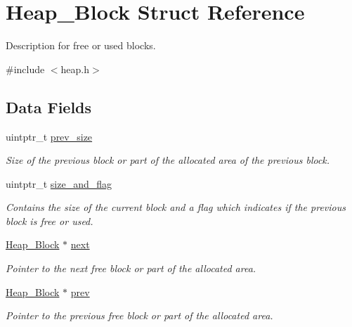 \hypertarget{structHeap__Block}{}\section{Heap\+\_\+\+Block Struct Reference}
\label{structHeap__Block}


Description for free or used blocks.  




{\ttfamily \#include $<$heap.\+h$>$}

\subsection*{Data Fields}
\begin{DoxyCompactItemize}
\item 
uintptr\+\_\+t \mbox{\hyperlink{structHeap__Block_ac19e44024599b1042cc628ccfd3abf53}{prev\+\_\+size}}
\begin{DoxyCompactList}\small\item\em Size of the previous block or part of the allocated area of the previous block. \end{DoxyCompactList}\item 
uintptr\+\_\+t \mbox{\hyperlink{structHeap__Block_ae6f771ed25f18d98146417d7cf38d69c}{size\+\_\+and\+\_\+flag}}
\begin{DoxyCompactList}\small\item\em Contains the size of the current block and a flag which indicates if the previous block is free or used. \end{DoxyCompactList}\item 
\mbox{\hyperlink{structHeap__Block}{Heap\+\_\+\+Block}} $\ast$ \mbox{\hyperlink{structHeap__Block_aec0a85358dfd11d8b7a3878d30977d6d}{next}}
\begin{DoxyCompactList}\small\item\em Pointer to the next free block or part of the allocated area. \end{DoxyCompactList}\item 
\mbox{\hyperlink{structHeap__Block}{Heap\+\_\+\+Block}} $\ast$ \mbox{\hyperlink{structHeap__Block_a76e15fe01db6f3e3e7f206a744280828}{prev}}
\begin{DoxyCompactList}\small\item\em Pointer to the previous free block or part of the allocated area. \end{DoxyCompactList}\end{DoxyCompactItemize}


